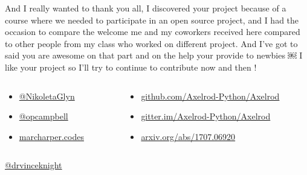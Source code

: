 \documentclass{beamer}
\begin{document}
\begin{frame}
    \begin{footnotesize}
        \begin{tcolorbox}[colback=github,colframe=blue!40!black,title=
                Julie Rymer - \href{https://gitter.im/Axelrod-Python/Axelrod?at=591388592b926f8a6741435d}
                {@Chadys} - (10 May 2017):
    ]
                And I really wanted to thank you all, I discovered your project because of a
                course where we needed to participate in an open source project, and I had the
                occasion to compare the welcome me and my coworkers received here compared to
                other people from my class who worked on different project. And I've got to said
                you are awesome on that part and on the help your provide to newbies ￼ I like
                your project so I'll try to continue to contribute now and then !
       \end{tcolorbox}
    \end{footnotesize}

   \begin{columns}
        \begin{column}{.35\textwidth}
            \begin{itemize}
                \item \href{https://twitter.com/NikoletaGlyn}{@NikoletaGlyn}
                \item \href{https://twitter.com/opcampbell}{@opcampbell}
                \item \href{http://marcharper.codes/}{marcharper.codes}
            \end{itemize}
        \end{column}
        \begin{column}{.65\textwidth}
            \begin{itemize}
                \item \href{https://github.com/Axelrod-Python/Axelrod}{github.com/Axelrod-Python/Axelrod}
                \item \href{https://gitter.im/Axelrod-Python/Axelrod}{gitter.im/Axelrod-Python/Axelrod}
                \item
                    \href{https://arxiv.org/abs/1707.06920}{arxiv.org/abs/1707.06920}
            \end{itemize}
        \end{column}
   \end{columns}

        \begin{center}
               \href{https://twitter.com/drvinceknight}{@drvinceknight}
        \end{center}


\end{frame}
\end{document}
